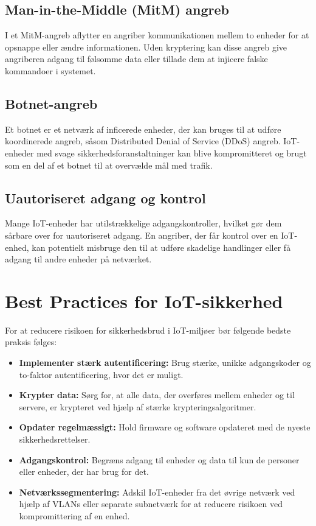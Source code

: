 \documentclass[12pt,a4paper]{book}
\begin{document}
	\subsection*{Man-in-the-Middle (MitM) angreb}
	I et MitM-angreb aflytter en angriber kommunikationen mellem to enheder for at opsnappe eller ændre informationen. Uden kryptering kan disse angreb give angriberen adgang til følsomme data eller tillade dem at injicere falske kommandoer i systemet.
	
	\subsection*{Botnet-angreb}
	Et botnet er et netværk af inficerede enheder, der kan bruges til at udføre koordinerede angreb, såsom Distributed Denial of Service (DDoS) angreb. IoT-enheder med svage sikkerhedsforanstaltninger kan blive kompromitteret og brugt som en del af et botnet til at overvælde mål med trafik.
	
	\subsection*{Uautoriseret adgang og kontrol}
	Mange IoT-enheder har utilstrækkelige adgangskontroller, hvilket gør dem sårbare over for uautoriseret adgang. En angriber, der får kontrol over en IoT-enhed, kan potentielt misbruge den til at udføre skadelige handlinger eller få adgang til andre enheder på netværket.
	
	\section*{Best Practices for IoT-sikkerhed}
	For at reducere risikoen for sikkerhedsbrud i IoT-miljøer bør følgende bedste praksis følges:
	\begin{itemize}
		\item \textbf{Implementer stærk autentificering:} Brug stærke, unikke adgangskoder og to-faktor autentificering, hvor det er muligt.
		\item \textbf{Krypter data:} Sørg for, at alle data, der overføres mellem enheder og til servere, er krypteret ved hjælp af stærke krypteringsalgoritmer.
		\item \textbf{Opdater regelmæssigt:} Hold firmware og software opdateret med de nyeste sikkerhedsrettelser.
		\item \textbf{Adgangskontrol:} Begræns adgang til enheder og data til kun de personer eller enheder, der har brug for det.
		\item \textbf{Netværkssegmentering:} Adskil IoT-enheder fra det øvrige netværk ved hjælp af VLANs eller separate subnetværk for at reducere risikoen ved kompromittering af en enhed.
	\end{itemize}
	
\end{document}
